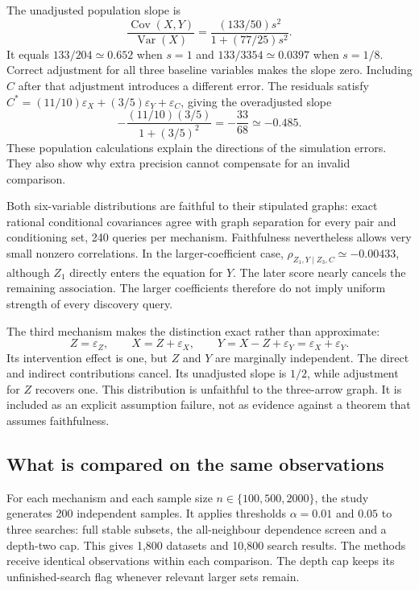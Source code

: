 The unadjusted population slope is
\begin{equation}
 \frac{\operatorname{Cov}(X,Y)}{\operatorname{Var}(X)}
 =\frac{(133/50)s^2}{1+(77/25)s^2}.
 \label{closure30:omitted-slope}
\end{equation}
It equals $133/204\simeq0.652$ when $s=1$ and
$133/3354\simeq0.0397$ when $s=1/8$. Correct adjustment for all three baseline
variables makes the slope zero. Including $C$ after that adjustment introduces
a different error. The residuals satisfy
$C^*=(11/10)\varepsilon_X+(3/5)\varepsilon_Y+\varepsilon_C$, giving the
overadjusted slope
\begin{equation}
 -\frac{(11/10)(3/5)}{1+(3/5)^2}=-\frac{33}{68}\simeq-0.485.
 \label{closure30:later-slope}
\end{equation}
These population calculations explain the directions of the simulation errors.
They also show why extra precision cannot compensate for an invalid comparison.

Both six-variable distributions are faithful to their stipulated graphs:
exact rational conditional covariances agree with graph separation for every
pair and conditioning set, 240 queries per mechanism. Faithfulness nevertheless
allows very small nonzero correlations. In the larger-coefficient case,
$\rho_{Z_1,Y\mid Z_3,C}\simeq-0.00433$, although $Z_1$ directly enters the
equation for $Y$. The later score nearly cancels the remaining association.
The larger coefficients therefore do not imply uniform strength of every
discovery query.

The third mechanism makes the distinction exact rather than approximate:
\begin{equation}
 Z=\varepsilon_Z,\qquad X=Z+\varepsilon_X,\qquad
 Y=X-Z+\varepsilon_Y=\varepsilon_X+\varepsilon_Y.
 \label{closure30:cancellation}
\end{equation}
Its intervention effect is one, but $Z$ and $Y$ are marginally independent.
The direct and indirect contributions cancel. Its unadjusted slope is $1/2$,
while adjustment for $Z$ recovers one. This distribution is unfaithful to the
three-arrow graph. It is included as an explicit assumption failure, not as
evidence against a theorem that assumes faithfulness.

\subsection{What is compared on the same observations}

For each mechanism and each sample size $n\in\{100,500,2000\}$, the study
generates 200 independent samples. It applies thresholds $\alpha=0.01$ and
$0.05$ to three searches: full stable subsets, the all-neighbour dependence
screen and a depth-two cap. This gives 1,800 datasets and 10,800 search results.
The methods receive identical observations within each comparison. The depth
cap keeps its unfinished-search flag whenever relevant larger sets remain.

